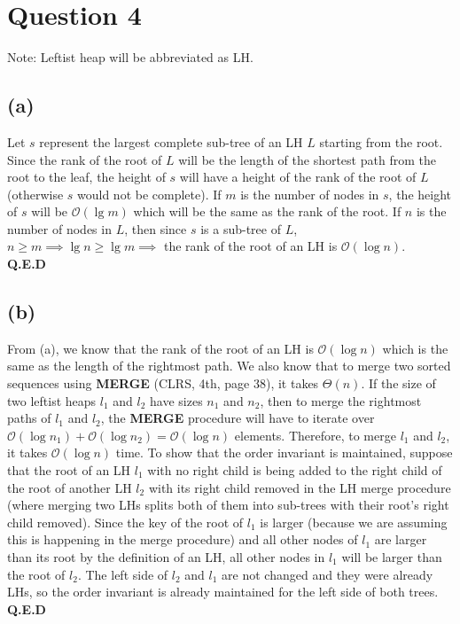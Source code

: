 \section{Question 4}
    Note: Leftist heap will be abbreviated as LH.
    \subsection{(a)}
    Let $s$ represent the largest complete sub-tree of an LH $L$ starting from the root. Since the rank of the root of $L$ will be the length of the shortest path from the root to the leaf, the height of $s$ will have a height of the rank of the root of $L$ (otherwise $s$ would not be complete). If $m$ is the number of nodes in $s$, the height of $s$ will be $\mathcal{O}(\lg{m})$ which will be the same as the rank of the root. If $n$ is the number of nodes in $L$, then since $s$ is a sub-tree of $L$, $n \geq m \implies \lg{n} \geq \lg{m} \implies$ the rank of the root of an LH is $\mathcal{O}(\log{n})$.\\
    \textbf{Q.E.D}
    
    \subsection{(b)}
    From (a), we know that the rank of the root of an LH is $\mathcal{O}(\log{n})$ which is the same as the length of the rightmost path. We also know that to merge two sorted sequences using \textbf{MERGE} (CLRS, 4th, page 38), it takes $\Theta(n)$. If the size of two leftist heaps $l_1$ and $l_2$ have sizes $n_1$ and $n_2$, then to merge the rightmost paths of $l_1$ and $l_2$, the \textbf{MERGE} procedure will have to iterate over $\mathcal{O}(\log{n_1}) + \mathcal{O}(\log{n_2}) = \mathcal{O}(\log{n})$ elements. Therefore, to merge $l_1$ and $l_2$, it takes $\mathcal{O}(\log{n})$ time. To show that the order invariant is maintained, suppose that the root of an LH $l_1$ with no right child is being added to the right child of the root of another LH $l_2$ with its right child removed in the LH merge procedure (where merging two LHs splits both of them into sub-trees with their root's right child removed). Since the key of the root of $l_1$ is larger (because we are assuming this is happening in the merge procedure) and all other nodes of $l_1$ are larger than its root by the definition of an LH, all other nodes in $l_1$ will be larger than the root of $l_2$. The left side of $l_2$ and $l_1$ are not changed and they were already  LHs, so the order invariant is already maintained for the left side of both trees.\\
    \textbf{Q.E.D}
    
